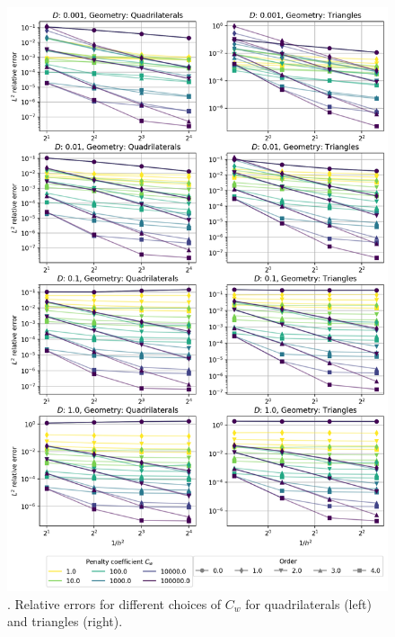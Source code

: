 \begin{figure}[p!]
	\centering
	\includegraphics[height=\textheight]{../figs/parametric/advdiff_2D/quarteroni1.png}
	\caption{. Relative errors for different choices of $C_w$ for
	quadrilaterals (left) and triangles (right).}
	\label{fig:qconv1}
\end{figure}
